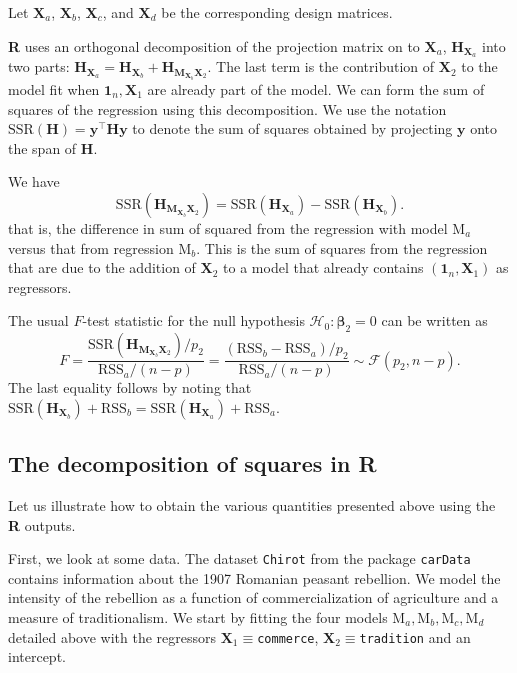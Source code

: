\documentclass[]{book}
\theoremstyle{definition}
\theoremstyle{definition}
\theoremstyle{definition}
\theoremstyle{remark}
\begin{document}
Let \(\mathbf{X}_a\), \(\mathbf{X}_b\), \(\mathbf{X}_c\), and
\(\mathbf{X}_d\) be the corresponding design matrices.

\textbf{R} uses an orthogonal decomposition of the projection matrix on
to \(\mathbf{X}_a\), \(\mathbf{H}_{\mathbf{X}_a}\) into two parts:
\(\mathbf{H}_{\mathbf{X}_a}= \mathbf{H}_{\mathbf{X}_b} + \mathbf{H}_{\mathbf{M}_{\mathbf{X}_b}\mathbf{X}_2}.\)
The last term is the contribution of \(\mathbf{X}_2\) to the model fit
when \(\mathbf{1}_n, \mathbf{X}_1\) are already part of the model. We
can form the sum of squares of the regression using this decomposition.
We use the notation
\(\mathrm{SSR}(\mathbf{H}) = \boldsymbol{y}^\top\mathbf{H}\boldsymbol{y}\)
to denote the sum of squares obtained by projecting \(\boldsymbol{y}\)
onto the span of \(\mathbf{H}\).

We have
\[\mathrm{SSR}(\mathbf{H}_{\mathbf{M}_{\mathbf{X}_b}\mathbf{X}_2}) = \mathrm{SSR}(\mathbf{H}_{\mathbf{X}_a}) - \mathrm{SSR}(\mathbf{H}_{\mathbf{X}_b}).\]
that is, the difference in sum of squared from the regression with model
\(\mathrm{M}_a\) versus that from regression \(\mathrm{M}_b.\) This is
the sum of squares from the regression that are due to the addition of
\(\mathbf{X}_2\) to a model that already contains
\((\mathbf{1}_n, \mathbf{X}_1)\) as regressors.

The usual \(F\)-test statistic for the null hypothesis
\(\mathscr{H}_0: \boldsymbol{\beta}_2=0\) can be written as
\[F = \frac{\mathrm{SSR}(\mathbf{H}_{\mathbf{M}_{\mathbf{X}_b}\mathbf{X}_2})/p_2}{\mathrm{RSS}_a/(n-p)} = \frac{(\mathrm{RSS}_b-\mathrm{RSS}_a)/p_2}{\mathrm{RSS}_a/(n-p)} \sim \mathcal{F}(p_2, n-p).\]
The last equality follows by noting that
\(\mathrm{SSR}(\mathbf{H}_{\mathbf{X}_b})+ \mathrm{RSS}_b=\mathrm{SSR}(\mathbf{H}_{\mathbf{X}_a})+ \mathrm{RSS}_a\).

\hypertarget{the-decomposition-of-squares-in-r}{%
\subsection{\texorpdfstring{The decomposition of squares in
\textbf{R}}{The decomposition of squares in R}}\label{the-decomposition-of-squares-in-r}}

Let us illustrate how to obtain the various quantities presented above
using the \textbf{R} outputs.

First, we look at some data. The dataset \texttt{Chirot} from the
package \texttt{carData} contains information about the 1907 Romanian
peasant rebellion. We model the intensity of the rebellion as a function
of commercialization of agriculture and a measure of traditionalism. We
start by fitting the four models
\(\mathrm{M}_a, \mathrm{M}_b, \mathrm{M}_c, \mathrm{M}_d\) detailed
above with the regressors \(\mathbf{X}_1 \equiv\)\texttt{commerce},
\(\mathbf{X}_2 \equiv\)\texttt{tradition} and an intercept.
\end{document}
